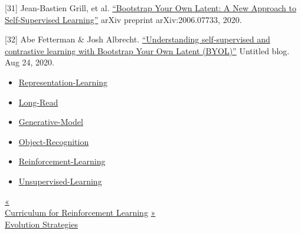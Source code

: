 {[}31{]} Jean-Bastien Grill, et al. \href{https://arxiv.org/abs/2006.07733}{``Bootstrap Your Own Latent: A New Approach to Self-Supervised Learning''} arXiv preprint arXiv:2006.07733, 2020.

{[}32{]} Abe Fetterman \& Josh Albrecht. \href{https://untitled-ai.github.io/understanding-self-supervised-contrastive-learning.html}{``Understanding self-supervised and contrastive learning with Bootstrap Your Own Latent (BYOL)''} Untitled blog. Aug 24, 2020.

\begin{itemize}
\tightlist
\item
  \href{https://lilianweng.github.io/tags/representation-learning/}{Representation-Learning}
\item
  \href{https://lilianweng.github.io/tags/long-read/}{Long-Read}
\item
  \href{https://lilianweng.github.io/tags/generative-model/}{Generative-Model}
\item
  \href{https://lilianweng.github.io/tags/object-recognition/}{Object-Recognition}
\item
  \href{https://lilianweng.github.io/tags/reinforcement-learning/}{Reinforcement-Learning}
\item
  \href{https://lilianweng.github.io/tags/unsupervised-learning/}{Unsupervised-Learning}
\end{itemize}

\href{https://lilianweng.github.io/posts/2020-01-29-curriculum-rl/}{{« }\\
{Curriculum for Reinforcement Learning}} \href{https://lilianweng.github.io/posts/2019-09-05-evolution-strategies/}{{ »}\\
{Evolution Strategies}}

